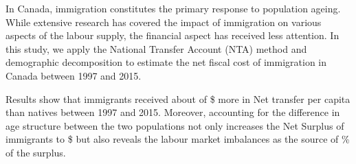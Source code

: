 In Canada, immigration constitutes the primary response to population ageing. While extensive research has covered the impact of immigration on various aspects of the labour supply, the financial aspect has received less attention.
In this study, we apply the National Transfer Account (NTA) method and demographic decomposition to estimate the net fiscal cost of immigration in Canada between 1997 and 2015.

\vspace{0.7em}\par
Results show that immigrants received about of \$ more in Net transfer per capita than natives between 1997 and 2015.
Moreover, accounting for the difference in age structure between the two populations not only increases the Net Surplus of immigrants to \$ but also reveals the labour market imbalances as the source of \% of the surplus.